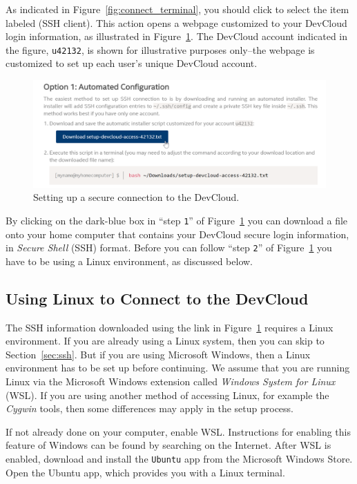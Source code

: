 \documentclass[11pt, twoside, pdftex]{article}
\newcommand{\blue}[1]{{\color{blue}\sf{#1}}}
\begin{document}
As indicated in Figure~\ref{fig:connect_terminal}, you should click to select the item 
labeled \blue{Linux$^*$ or macOS} {\sf (SSH client)}. This action opens a webpage customized to
your DevCloud login information, as illustrated in Figure~\ref{fig:ssh}. The DevCloud account
indicated in the figure, \texttt{u42132}, is shown for illustrative purposes only--the
webpage is customized to set up each user's unique DevCloud account.

\begin{figure}[H]
   \begin{center}
      \includegraphics[width=\textwidth]{figures/ssh.png}
   \caption{Setting up a secure connection to the DevCloud.} 
	 \label{fig:ssh}
	 \end{center}
\end{figure}

By clicking on the dark-blue box in ``step \texttt{1}'' of Figure~\ref{fig:ssh} you can download a 
file onto your home computer that contains your DevCloud secure login information, 
in {\it Secure Shell} (SSH) format.
Before you can follow ``step \texttt{2}'' of Figure~\ref{fig:ssh} you have to be using a
Linux environment, as discussed below.

\subsection{Using Linux to Connect to the DevCloud} 
The SSH information downloaded using the link in Figure~\ref{fig:ssh} requires 
a Linux environment. If you are already using a Linux system, then you can skip
to Section~\ref{sec:ssh}. But if you are using Microsoft Windows, then a Linux environment 
has to be set up before continuing. We assume that
you are running Linux via the Microsoft Windows extension called 
{\it Windows System for Linux} (WSL). If you are using another method of accessing Linux, 
for example the {\it Cygwin} tools, then some differences may apply in the setup process.

If not already done on your computer, enable WSL. Instructions for enabling this feature of
Windows can be found by searching on the Internet. After WSL is enabled, download and
install the \texttt{Ubuntu} app from the Microsoft Windows Store. Open the Ubuntu app,
which provides you with a Linux terminal.
\end{document}
